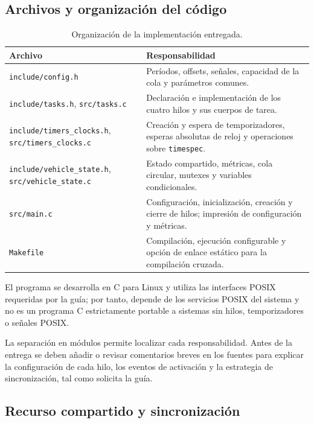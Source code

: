 \documentclass[12pt,a4paper]{article}
\begin{document}
\subsection{Archivos y organización del código}

\begin{table}[htbp]
  \centering
  \caption{Organización de la implementación entregada.}
  \small
  \begin{tabularx}{\linewidth}{@{}l X@{}}
    \toprule
    Archivo & Responsabilidad \\
    \midrule
    \texttt{include/config.h} & Períodos, offsets, señales, capacidad de la cola y parámetros comunes. \\
    \texttt{include/tasks.h}, \texttt{src/tasks.c} & Declaración e implementación de los cuatro hilos y sus cuerpos de tarea. \\
    \texttt{include/timers\_clocks.h}, \texttt{src/timers\_clocks.c} & Creación y espera de temporizadores, esperas absolutas de reloj y operaciones sobre \texttt{timespec}. \\
    \texttt{include/vehicle\_state.h}, \texttt{src/vehicle\_state.c} & Estado compartido, métricas, cola circular, mutexes y variables condicionales. \\
    \texttt{src/main.c} & Configuración, inicialización, creación y cierre de hilos; impresión de configuración y métricas. \\
    \texttt{Makefile} & Compilación, ejecución configurable y opción de enlace estático para la compilación cruzada. \\
    \bottomrule
  \end{tabularx}
\end{table}

El programa se desarrolla en C para Linux y utiliza las interfaces POSIX requeridas por la guía; por tanto, depende de los servicios POSIX del sistema y no es un programa C estrictamente portable a sistemas sin hilos, temporizadores o señales POSIX.

La separación en módulos permite localizar cada responsabilidad. Antes de la entrega se deben añadir o revisar comentarios breves en los fuentes para explicar la configuración de cada hilo, los eventos de activación y la estrategia de sincronización, tal como solicita la guía.

\subsection{Recurso compartido y sincronización}
\end{document}
